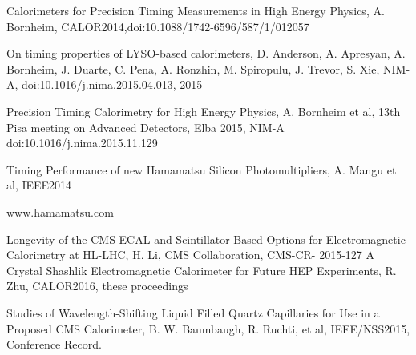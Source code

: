 \documentclass[preprint,1p]{elsarticle}
\begin{document}
\begin{thebibliography}{00}
 Calorimeters for Precision Timing Measurements in High Energy Physics, A. Bornheim, CALOR2014,doi:10.1088/1742-6596/587/1/012057

 On timing properties of LYSO-based calorimeters, D. Anderson, A. Apresyan, A. Bornheim, J. Duarte, C. Pena, A. Ronzhin, M. Spiropulu, J. Trevor, S. Xie, NIM-A, doi:10.1016/j.nima.2015.04.013, 2015

 Precision Timing Calorimetry for High Energy Physics, A. Bornheim et al, 13th Pisa meeting on Advanced Detectors, Elba 2015, NIM-A doi:10.1016/j.nima.2015.11.129

Timing Performance of new Hamamatsu Silicon Photomultipliers, A. Mangu et al, IEEE2014

 www.hamamatsu.com



 Longevity of the CMS ECAL and Scintillator-Based Options for Electromagnetic Calorimetry at HL-LHC, H. Li, CMS Collaboration, CMS-CR-
2015-127 
 A Crystal Shashlik Electromagnetic Calorimeter for Future HEP Experiments, R. Zhu, CALOR2016, these proceedings

 Studies of Wavelength-Shifting Liquid Filled Quartz Capillaries for Use in a Proposed CMS Calorimeter, B. W. Baumbaugh, R. Ruchti, 
et al, IEEE/NSS2015, Conference Record.






\end{thebibliography}
\end{document}
